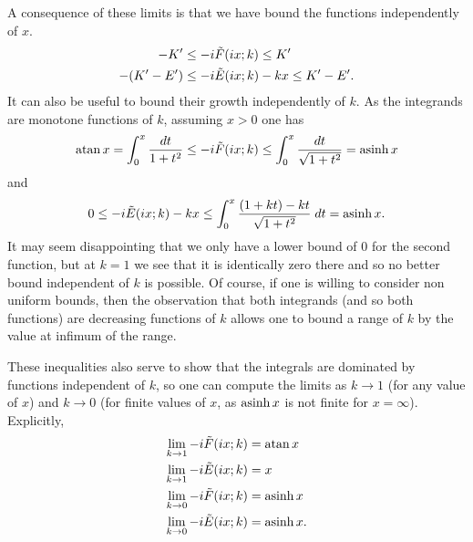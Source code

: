 A consequence of these limits is that we have bound the functions independently of $x$.
\begin{align}
-K' \leq -i &\tilde{F}(i x;k) \leq K' \\
- (K' - E') \leq -i &\tilde E(i x; k) - k x \leq K' - E'. \label{eqn:tildeEatInf}
\end{align}
It can also be useful to bound their growth independently of $k$. As the integrands are monotone functions of $k$, assuming $x>0$ one has
\[
\operatorname{atan} {x} = \int_0 ^x \frac{dt}{1+t^2} \leq -i \tilde{F}(i x;k) \leq \int_0 ^x \frac{dt}{\sqrt{1+t^2}} = \operatorname{asinh} x
\]
and
\[
0 \leq -i \tilde E(i x; k) - k x \leq
\int_0^x \frac{(1+kt) - kt}{\sqrt{1+t^2}}\;dt = \operatorname{asinh} x.
\]
It may seem disappointing that we only have a lower bound of $0$ for the second function, but at $k=1$ we see that it is identically zero there and so no better bound independent of $k$ is possible. Of course, if one is willing to consider non uniform bounds, then the observation that both integrands (and so both functions) are decreasing functions of $k$ allows one to bound a range of $k$ by the value at infimum of the range.

These inequalities also serve to show that the integrals are dominated by functions independent of $k$, so one can compute the limits as $k \to 1$ (for any value of $x$) and $k \to 0$ (for finite values of $x$, as $\operatorname{asinh} x$ is not finite for $x=\infty$). Explicitly,
\begin{align}
\lim_{k\to 1} -i \tilde{F}(i x; k) &= \operatorname{atan} {x} \\
\lim_{k\to 1} -i \tilde{E}(i x; k) &= x \\
\lim_{k\to 0} -i \tilde{F}(i x; k) &= \operatorname{asinh} {x} \\
\lim_{k\to 0} -i \tilde{E}(i x; k) &= \operatorname{asinh} {x}.
\end{align}





